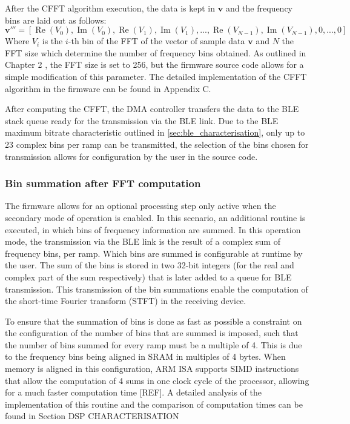 After the CFFT algorithm execution, the data is kept in $\mathbf{v}$ and the frequency bins are laid out as follows:
\begin{equation}
	\mathbf{v'''} = [\operatorname{Re}(V_0), \operatorname{Im}(V_0),\operatorname{Re}(V_1), \operatorname{Im}(V_1), ..., \operatorname{Re}(V_{N-1}), \operatorname{Im}(V_{N-1}),0,...,0]
\end{equation}
Where $V_i$ is the $i$-th bin of the FFT of the vector of sample data $\mathbf{v}$ and $N$ the FFT size which determine the number of frequency bins obtained. As outlined in Chapter 2 %
, the FFT size is set to 256, but the firmware source code allows for a simple modification of this parameter. The detailed implementation of the CFFT algorithm in the firmware can be found in Appendix C. %

After computing the CFFT, the DMA controller transfers the data to the BLE stack queue ready for the transmission via the BLE link. Due to the BLE maximum bitrate characteristic outlined in \cref{sec:ble_characterisation}, only up to 23 complex bins per ramp can be transmitted, the selection of the bins chosen for transmission allows for configuration by the user in the source code.

\subsubsection{Bin summation after FFT computation}

The firmware allows for an optional processing step only active when the secondary mode of operation is enabled. In this scenario, an additional routine is executed, in which bins of frequency information are summed. In this operation mode, the transmission via the BLE link is the result of a complex sum of frequency bins, per ramp. Which bins are summed is configurable at runtime by the user. The sum of the bins is stored in two 32-bit integers (for the real and complex part of the sum respectively) that is later added to a queue for BLE transmission. This transmission of the bin summations enable the computation of the short-time Fourier transform (STFT) in the receiving device.

To ensure that the summation of bins is done as fast as possible a constraint on the configuration of the number of bins that are summed is imposed, such that the number of bins summed for every ramp must be a multiple of 4. This is due to the frequency bins being aligned in SRAM in multiples of 4 bytes. When memory is aligned in this configuration, ARM ISA supports SIMD instructions that allow the computation of 4 sums in one clock cycle of the processor, allowing for a much faster computation time [REF]. A detailed analysis of the implementation of this routine and the comparison of computation times can be found in Section DSP CHARACTERISATION %

